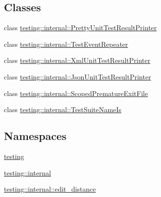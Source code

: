 \subsection*{Classes}
\begin{DoxyCompactItemize}
\item 
class \mbox{\hyperlink{classtesting_1_1internal_1_1_pretty_unit_test_result_printer}{testing\+::internal\+::\+Pretty\+Unit\+Test\+Result\+Printer}}
\item 
class \mbox{\hyperlink{classtesting_1_1internal_1_1_test_event_repeater}{testing\+::internal\+::\+Test\+Event\+Repeater}}
\item 
class \mbox{\hyperlink{classtesting_1_1internal_1_1_xml_unit_test_result_printer}{testing\+::internal\+::\+Xml\+Unit\+Test\+Result\+Printer}}
\item 
class \mbox{\hyperlink{classtesting_1_1internal_1_1_json_unit_test_result_printer}{testing\+::internal\+::\+Json\+Unit\+Test\+Result\+Printer}}
\item 
class \mbox{\hyperlink{classtesting_1_1internal_1_1_scoped_premature_exit_file}{testing\+::internal\+::\+Scoped\+Premature\+Exit\+File}}
\item 
class \mbox{\hyperlink{classtesting_1_1internal_1_1_test_suite_name_is}{testing\+::internal\+::\+Test\+Suite\+Name\+Is}}
\end{DoxyCompactItemize}
\subsection*{Namespaces}
\begin{DoxyCompactItemize}
\item 
 \mbox{\hyperlink{namespacetesting}{testing}}
\item 
 \mbox{\hyperlink{namespacetesting_1_1internal}{testing\+::internal}}
\item 
 \mbox{\hyperlink{namespacetesting_1_1internal_1_1edit__distance}{testing\+::internal\+::edit\+\_\+distance}}
\end{DoxyCompactItemize}
